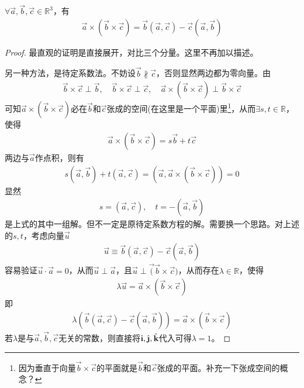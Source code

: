 \begin{lemma}
  $\forall \vec a,\vec b,\vec c\in\mathbb{R}^3$，有
  \begin{align*}
    \vec a\times(\vec b\times \vec c)=\vec b(\vec a,\vec c) - \vec c(\vec a,\vec b)
  \end{align*}
\end{lemma}
\begin{proof}
  最直观的证明是直接展开，对比三个分量。这里不再加以描述。

  另一种方法，是待定系数法。不妨设$\vec b\not\parallel\vec c$，否则显然两边都为零向量。由
  \begin{align*}
    \vec b\times\vec c\perp \vec b,\quad \vec b\times\vec c\perp \vec c,\quad
    \vec a\times(\vec b\times\vec c)\perp \vec b\times \vec c
  \end{align*}
  可知$\vec a\times(\vec b\times\vec c)$必在$\vec b$和$\vec c$张成的空间(在这里是一个平面)里\footnote{因为垂直于向量$\vec b\times\vec c$的平面就是$\vec b$和$\vec c$张成的平面。\color{red}补充一下张成空间的概念？}，从而$\exists s,t\in\mathbb{R}$，使得
  \begin{align*}
    \vec a\times(\vec b\times\vec c) = s\vec b +t\vec c
  \end{align*}
  两边与$\vec a$作点积，则有
  \begin{align*}
    s(\vec a,\vec b)+t(\vec a,\vec c)=(\vec a, \vec a\times(\vec b\times\vec c))=0
  \end{align*}
  显然
  \begin{align*}
    s=(\vec a,\vec c),\quad
    t=-(\vec a,\vec b)
  \end{align*}
  是上式的其中一组解。{\color{red}但不一定是原待定系数方程的解。需要换一个思路。}对上述的$s,t$，考虑向量$\vec u$
  \begin{align*}
    \vec u\equiv \vec b(\vec a,\vec c) - \vec c(\vec a, \vec b)
  \end{align*}
  容易验证$\vec u\cdot \vec a=0$，从而$\vec u\perp\vec a$，且$\vec u\perp\vec (\vec b\times\vec c)$，从而存在$\lambda\in\mathbb{R}$，使得
  \begin{align*}
    \lambda \vec u = \vec a\times(\vec b\times\vec c)
  \end{align*}
  即
  \begin{align*}
    \lambda(\vec b(\vec a,\vec c) - \vec c(\vec a, \vec b)) = \vec a\times(\vec b\times\vec c)
  \end{align*}
  {\color{red}若$\lambda$是与$\vec a,\vec b,\vec c$无关的常数，则直接将$\ihat, \jhat, \khat$代入可得$\lambda=1$。}



\end{proof}
